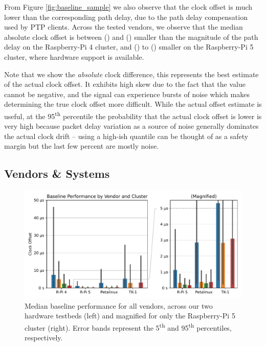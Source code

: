 From Figure \ref{fig:baseline_sample} we also observe that the clock offset is much lower than the corresponding path delay, due to the path delay compensation used by PTP clients. Across the tested vendors, we observe that the median absolute clock offset is between \fRatio{\cmpMin} (\fVendor{\cmpMinArg}) and \fRatio{\cmpMax} (\fVendor{\cmpMaxArg}) smaller than the magnitude of the path delay on the Raspberry-Pi 4 cluster,%
%
and \fRatio[-1]{\cmpMin} (\fVendor{\cmpMinArg}) to \fRatio[-1]{\cmpMax} (\fVendor{\cmpMaxArg}) smaller on the Raspberry-Pi 5 cluster, where hardware support is available.

Note that we show the \emph{absolute} clock difference, this represents the best estimate of the actual clock offset. It exhibits high skew due to the fact that the value cannot be negative, and the signal can experience bursts of noise which makes determining the true clock offset more difficult. While the actual offset estimate is useful, at the 95\textsuperscript{th} percentile the probability that the actual clock offset is lower is very high because packet delay variation as a source of noise generally dominates the actual clock drift -- using a high-ish quantile can be thought of as a safety margin but the last few percent are mostly noise.

\subsection{Vendors \& Systems}

\begin{figure}
    \centering
    \includegraphics[width=\linewidth]{res/generated/base/vendor_comparison.pdf}
    \legend
    \caption{Median baseline performance for all vendors, across our two hardware testbeds (left) and magnified for only the Raspberry-Pi 5 cluster (right). Error bands represent the 5\textsuperscript{th} and 95\textsuperscript{th} percentiles, respectively.}
    \label{fig:baseline}
\end{figure}

